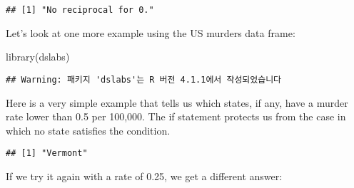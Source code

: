 \documentclass[
]{article}
\newenvironment{Shaded}{\begin{snugshade}}{\end{snugshade}}
\newcommand{\ControlFlowTok}[1]{\textcolor[rgb]{0.13,0.29,0.53}{\textbf{#1}}}
\newcommand{\DecValTok}[1]{\textcolor[rgb]{0.00,0.00,0.81}{#1}}
\newcommand{\FloatTok}[1]{\textcolor[rgb]{0.00,0.00,0.81}{#1}}
\newcommand{\FunctionTok}[1]{\textcolor[rgb]{0.00,0.00,0.00}{#1}}
\newcommand{\NormalTok}[1]{#1}
\newcommand{\OtherTok}[1]{\textcolor[rgb]{0.56,0.35,0.01}{#1}}
\newcommand{\SpecialCharTok}[1]{\textcolor[rgb]{0.00,0.00,0.00}{#1}}
\newcommand{\StringTok}[1]{\textcolor[rgb]{0.31,0.60,0.02}{#1}}
\begin{document}
\begin{verbatim}
## [1] "No reciprocal for 0."
\end{verbatim}

Let's look at one more example using the US murders data frame:

\begin{Shaded}
\begin{Highlighting}[]
\FunctionTok{library}\NormalTok{(dslabs)}
\end{Highlighting}
\end{Shaded}

\begin{verbatim}
## Warning: 패키지 'dslabs'는 R 버전 4.1.1에서 작성되었습니다
\end{verbatim}

\begin{Shaded}
\end{Shaded}

Here is a very simple example that tells us which states, if any, have a
murder rate lower than 0.5 per 100,000. The if statement protects us
from the case in which no state satisfies the condition.

\begin{Shaded}
\end{Shaded}

\begin{verbatim}
## [1] "Vermont"
\end{verbatim}

If we try it again with a rate of 0.25, we get a different answer:

\begin{Shaded}
\end{Shaded}
\end{document}
